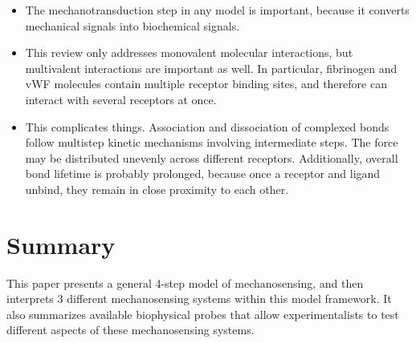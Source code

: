 \documentclass[
10pt, %
letterpaper, %
twocolumn, %
landscape %
]{article}
\begin{document}
\begin{itemize}
\item The mechanotransduction step in any model is important, because
  it converts mechanical signals into biochemical signals.
\item This review only addresses monovalent molecular interactions,
  but multivalent interactions are important as well. In particular,
  fibrinogen and vWF molecules contain multiple receptor binding
  sites, and therefore can interact with several receptors at once.
\item This complicates things. Association and dissociation of
  complexed bonds follow multistep kinetic mechanisms involving
  intermediate steps. The force may be distributed unevenly across
  different receptors. Additionally, overall bond lifetime is probably
  prolonged, because once a receptor and ligand unbind, they remain in
  close proximity to each other.
\end{itemize}


\section*{Summary}

This paper presents a general 4-step model of mechanosensing, and then
interprets 3 different mechanosensing systems within this model
framework. It also summarizes available biophysical probes that allow
experimentalists to test different aspects of these mechanosensing
systems. 


\renewcommand{\refname}{Reference} %


\end{document}
